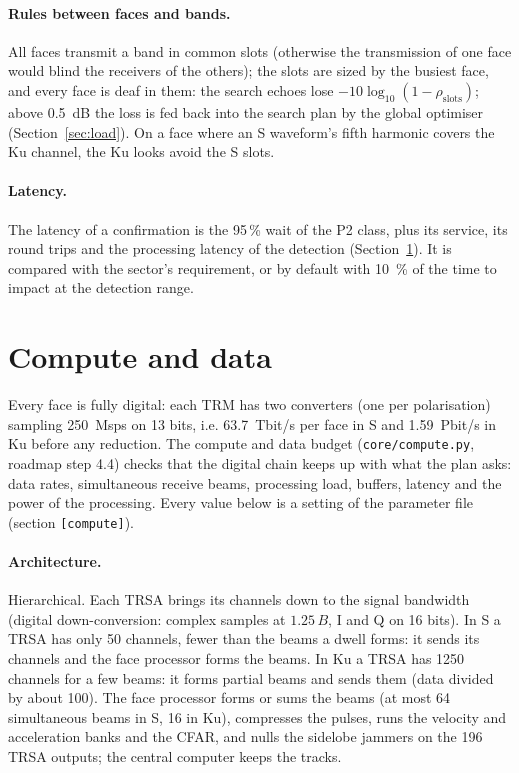 \documentclass[11pt,a4paper]{article}
\newcommand{\code}[1]{\texttt{\small #1}}
\begin{document}
\paragraph{Rules between faces and bands.} All faces transmit a band in common slots (otherwise the transmission of one
face would blind the receivers of the others); the slots are sized by the busiest face, and every face is deaf in
them: the search echoes lose $-10\log_{10}(1-\rho_{\mathrm{slots}})$; above \SI{0.5}{dB} the loss is fed back into the
search plan by the global optimiser (Section~\ref{sec:load}). On a face where an S waveform's fifth harmonic covers the Ku channel, the Ku looks avoid the S
slots.

\paragraph{Latency.} The latency of a confirmation is the 95\,\% wait of the P2 class, plus its service, its round
trips and the processing latency of the detection (Section~\ref{sec:compute}). It is compared with the sector's
requirement, or by default with \SI{10}{\percent} of the time to impact at the detection range.

\section{Compute and data}\label{sec:compute}
Every face is fully digital: each TRM has two converters (one per polarisation) sampling \SI{250}{Msps} on 13 bits,
i.e. \SI{63.7}{Tbit/s} per face in S and \SI{1.59}{Pbit/s} in Ku before any reduction. The compute and data budget
(\code{core/compute.py}, roadmap step 4.4) checks that the digital chain keeps up with what the plan asks: data rates,
simultaneous receive beams, processing load, buffers, latency and the power of the processing. Every value below is a
setting of the parameter file (section \code{[compute]}).

\paragraph{Architecture.} Hierarchical. Each TRSA brings its channels down to the signal bandwidth (digital
down-conversion: complex samples at $1.25\,B$, I and Q on 16 bits). In S a TRSA has only 50 channels, fewer than the
beams a dwell forms: it sends its channels and the face processor forms the beams. In Ku a TRSA has \num{1250} channels
for a few beams: it forms partial beams and sends them (data divided by about 100). The face processor forms or sums
the beams (at most 64 simultaneous beams in S, 16 in Ku), compresses the pulses, runs the velocity and acceleration
banks and the CFAR, and nulls the sidelobe jammers on the 196 TRSA outputs; the central computer keeps the tracks.
\end{document}
